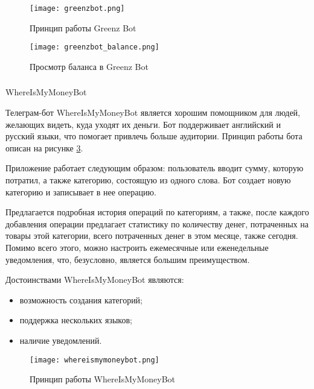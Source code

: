\begin{figure}[!h]
	\centering
	\texttt{[image: greenzbot.png]} 
	\caption{Принцип работы Greenz Bot}
	\label{fig:analysis:analogues:greenz}
\end{figure}

\begin{figure}[!h]
	\centering
	\texttt{[image: greenzbot\_balance.png]} 
	\caption{Просмотр баланса в Greenz Bot}
	\label{fig:analysis:analogues:greenz_balance}
\end{figure}

\newpage

\subsubsection{} WhereIsMyMoneyBot
\label{sec:analysis:analogues:whereismymoney}

Телеграм-бот WhereIsMyMoneyBot является хорошим помощником \linebreak для людей, желающих видеть, куда уходят их деньги. Бот поддерживает английский и русский языки, что помогает привлечь больше аудитории. Принцип работы бота описан на рисунке \ref{fig:analysis:analogues:whereismymoneybot}.

Приложение работает следующим образом: пользователь вводит сумму, которую потратил, а также категорию, состоящую из одного слова. Бот создает новую категорию и записывает в нее операцию.

Предлагается подробная история операций по категориям, а также, после каждого добавления операции предлагает статистику по количеству денег, потраченных на товары этой категории, всего потраченных денег в этом месяце, также сегодня. Помимо всего этого, можно настроить ежемесячные или еженедельные уведомления, что, безусловно, является большим преимуществом.

Достоинствами WhereIsMyMoneyBot являются:

\begin{itemize}
	\item возможность создания категорий;
	\item поддержка нескольких языков;
	\item наличие уведомлений.
\end{itemize}

\begin{figure}[!h]
	\centering
	\texttt{[image: whereismymoneybot.png]} 
	\caption{Принцип работы WhereIsMyMoneyBot}
	\label{fig:analysis:analogues:whereismymoneybot}
\end{figure}

